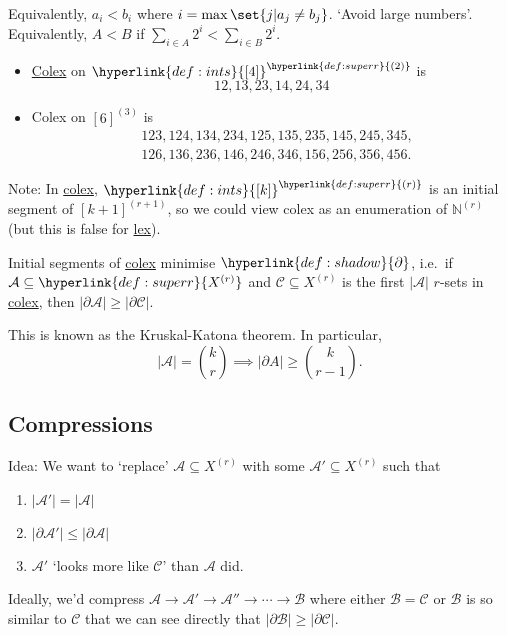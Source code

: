 \documentclass{article}
\let\subset\subseteq
\begin{document}
Equivalently, $a_i < b_i$ where $i = \max\set{j | a_j \neq b_j}$.
`Avoid large numbers'. Equivalently, $A < B$ if $\sum_{i \in A} 2^i < \sum_{i \in B} 2^i$.
\begin{eg}\leavevmode
  \begin{itemize}
    \item \hyperlink{def:colex}{Colex} on $\hyperlink{def:ints}{[4]}^{\hyperlink{def:superr}{(2)}}$ is
      \begin{equation*}
        12,13,23,14,24,34
      \end{equation*}
    \item Colex on $[6]^{(3)}$ is
      \begin{align*}
        &123,124,134,234,125,135,235,145,245,345,\\
        &126,136,236,146,246,346,156,256,356,456.
      \end{align*}
  \end{itemize}
\end{eg}
Note: In \hyperlink{def:colex}{colex}, $\hyperlink{def:ints}{[k]}^{\hyperlink{def:superr}{(r)}}$ is an initial segment of $[k+1]^{(r+1)}$, so we could view colex as an enumeration of $\mathbb{N}^{(r)}$ (but this is false for \hyperlink{def:lex}{lex}).

\begin{aim}
  Initial segments of \hyperlink{def:colex}{colex} minimise $\hyperlink{def:shadow}{\partial}$, i.e.\ if $\mathcal{A} \subset \hyperlink{def:superr}{X^{(r)}}$ and $\mathcal{C} \subset X^{(r)}$ is the first $|\mathcal{A}|$ $r$-sets in \hyperlink{def:colex}{colex}, then $|\partial \mathcal{A}| \geq |\partial \mathcal{C}|$.
\end{aim}
This is known as the Kruskal-Katona theorem.
In particular, \begin{equation*}|\mathcal{A}| = \binom{k}{r} \implies |\partial A| \geq \binom{k}{r-1}.\end{equation*}

\subsection{Compressions}
Idea: We want to `replace' $\mathcal{A} \subset X^{(r)}$ with some $\mathcal{A}' \subset X^{(r)}$ such that
\begin{enumerate}[label=(\roman*)]
  \item $|\mathcal{A}'| = |\mathcal{A}|$
  \item $|\partial \mathcal{A}'| \leq |\partial \mathcal{A}|$
  \item $\mathcal{A}'$ `looks more like $\mathcal{C}$' than $\mathcal{A}$ did.
\end{enumerate}
Ideally, we'd compress $\mathcal{A} \to \mathcal{A}' \to \mathcal{A}'' \to \dotsm \to \mathcal{B}$ where either $\mathcal{B} = \mathcal{C}$ or $\mathcal{B}$ is so similar to $\mathcal{C}$ that we can see directly that $|\partial \mathcal{B}| \geq |\partial \mathcal{C}|$.
\end{document}

